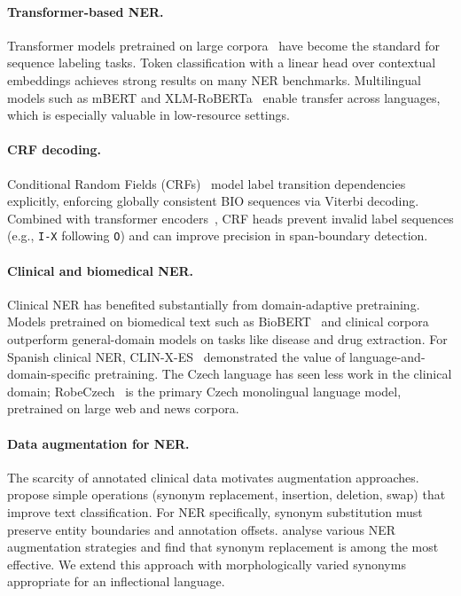 \documentclass[11pt]{article}
\begin{document}
\paragraph{Transformer-based NER.}
Transformer models pretrained on large corpora~\cite{devlin-etal-2019-bert} have become the
standard for sequence labeling tasks. Token classification with a linear head over contextual
embeddings achieves strong results on many NER benchmarks. Multilingual models such as
mBERT and XLM-RoBERTa~\cite{conneau-etal-2020-unsupervised} enable transfer across languages,
which is especially valuable in low-resource settings.

\paragraph{CRF decoding.}
Conditional Random Fields (CRFs)~\cite{lafferty2001conditional} model label transition
dependencies explicitly, enforcing globally consistent BIO sequences via Viterbi decoding.
Combined with transformer encoders~\cite{ma-hovy-2016-end}, CRF heads prevent invalid
label sequences (e.g., \texttt{I-X} following \texttt{O}) and can improve precision in
span-boundary detection.

\paragraph{Clinical and biomedical NER.}
Clinical NER has benefited substantially from domain-adaptive pretraining. Models
pretrained on biomedical text such as BioBERT~\cite{lee2020biobert} and
clinical corpora outperform general-domain models on tasks like disease and drug extraction.
For Spanish clinical NER, CLIN-X-ES~\cite{gutierrez-fandiño-etal-2022-maria} demonstrated
the value of language-and-domain-specific pretraining. The Czech language has seen less work
in the clinical domain; RobeCzech~\cite{straka-strakova-2020-robeczech} is the primary
Czech monolingual language model, pretrained on large web and news corpora.

\paragraph{Data augmentation for NER.}
The scarcity of annotated clinical data motivates augmentation approaches. \citet{wei-zou-2019-eda}
propose simple operations (synonym replacement, insertion, deletion, swap) that improve text
classification. For NER specifically, synonym substitution must preserve entity boundaries and
annotation offsets. \citet{dai-adel-2020-analysis} analyse various NER augmentation
strategies and find that synonym replacement is among the most effective. We extend this
approach with morphologically varied synonyms appropriate for an inflectional language.
\end{document}
